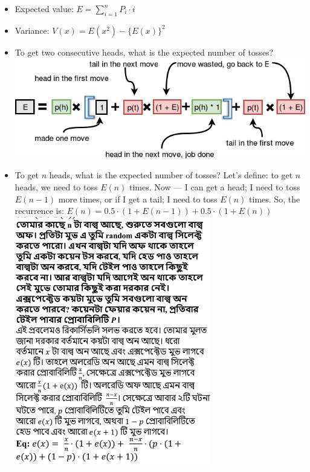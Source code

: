 \vspace{-5.5mm}
{\small
\begin{itemize}
\item Expected value: $E = \sum_{i=1}^{n} P_i \cdot i$
\item Variance: $V(x) = E(x^2) - \{E(x)\}^2$
\item To get two consecutive heads, what is the expected number of tosses?
\includegraphics[width=\linewidth]{images/expected_value_1.png}
\item To get $n$ heads, what is the expected number of tosses? Let’s define: to get $n$ heads, we need to toss $E(n)$ times. Now — I can get a head; I need to toss $E(n-1)$ more times, or if I get a tail; I need to toss $E(n)$ times. So, the recurrence is: $E(n) = 0.5 \cdot (1 + E(n-1)) + 0.5 \cdot (1 + E(n))$
\includegraphics[width=\linewidth]{images/expected_value_2.png}
\end{itemize}
}
